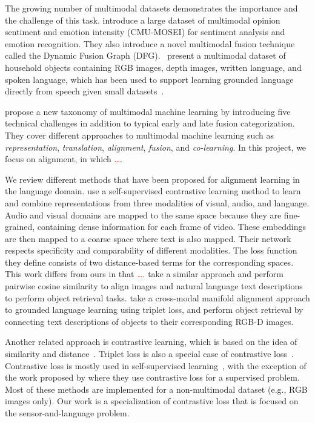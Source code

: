 \documentclass[sigconf,natbib=true,anonymous=true]{acmart}
\begin{document}
The growing number of multimodal datasets demonstrates the importance and the challenge of this task. \citet{bagher-zadeh-etal-2018-multimodal} introduce a large dataset of multimodal opinion sentiment and emotion intensity (CMU-MOSEI) for sentiment analysis and emotion recognition. They also introduce a novel multimodal fusion technique called the Dynamic Fusion Graph (DFG).~\citet{GoLD_UMBC} present a multimodal dataset of household objects containing RGB images, depth images, written language, and spoken language, which has been used to support learning grounded language directly from speech given small datasets~\cite{KebeAAAI2022}. 

\citet{baltrusaitisMultimodalMachineLearning2019} propose a new taxonomy of multimodal machine learning by introducing five technical challenges in addition to typical early and late fusion categorization. They cover different approaches to multimodal machine learning such as \textit{representation}, \textit{translation}, \textit{alignment}, \textit{fusion}, and \textit{co-learning}. In this project, we focus on alignment, in which \textcolor{red}{\dots}. 

We review different methods that have been proposed for alignment learning in the language domain. \citet{alayrac2020self} use a self-supervised contrastive learning method to learn and combine representations from three modalities of visual, audio, and language. Audio and visual domains are mapped to the same space because they are fine-grained, containing dense information for each frame of video. These embeddings are then mapped to a coarse space where text is also mapped. Their network respects specificity and comparability of different modalities. The loss function they define consists of two distance-based terms for the corresponding spaces. This work differs from ours in that \textcolor{red}{\dots}. \citet{Nguyen-RSS-20} take a similar approach and perform pairwise cosine similarity to align images and natural language text descriptions to perform object retrieval tasks. \citet{triplet_loss_2021_CVPR} take a cross-modal manifold alignment approach to grounded language learning using triplet loss, and perform object retrieval by connecting text descriptions of objects to their corresponding RGB-D images.

Another related approach is contrastive learning, which is based on the idea of similarity and distance~\cite{NEURIPS2020_supervised_contrastive,chen2020simple}. Triplet loss is also a special case of contrastive loss~\cite{NEURIPS2020_supervised_contrastive}. Contrastive loss is mostly used in self-supervised learning~\cite{alayrac2020self,chen2020simple}, with the exception of the work proposed by \citet{NEURIPS2020_supervised_contrastive} where they use contrastive loss for a supervised problem. Most of these methods are implemented for a non-multimodal dataset (e.g., RGB images only). Our work is a specialization of contrastive loss that is focused on the sensor-and-language problem.
\end{document}
